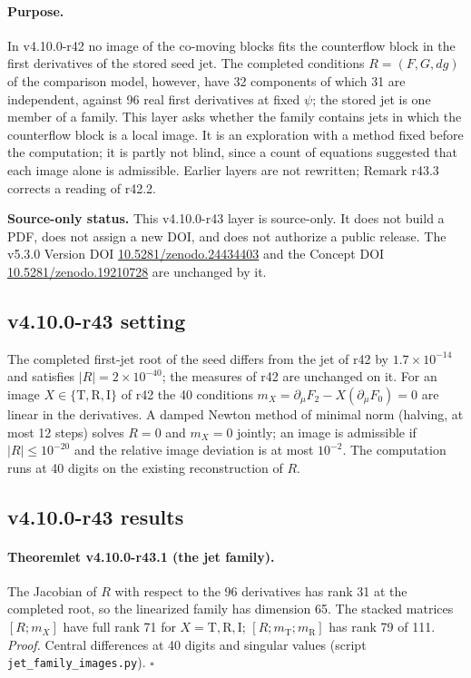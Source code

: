 \paragraph{Purpose.}
In v4.10.0-r42 no image of the co-moving blocks fits the counterflow block in the first derivatives of the stored seed jet.  The completed
conditions \(R=(F,G,dg)\) of the comparison model, however, have 32 components of which 31 are independent, against 96 real first derivatives at
fixed \(\psi\); the stored jet is one member of a family.  This layer asks whether the family contains jets in which the counterflow block is a
local image.  It is an exploration with a method fixed before the computation; it is partly not blind, since a count of equations suggested
that each image alone is admissible.  Earlier layers are not rewritten; Remark r43.3 corrects a reading of r42.2.

\noindent\textbf{Source-only status.}
This v4.10.0-r43 layer is source-only.  It does not build a PDF, does not assign a new DOI,
and does not authorize a public release.  The v5.3.0 Version DOI
\href{https://doi.org/10.5281/zenodo.24434403}{10.5281/zenodo.24434403} and the Concept DOI
\href{https://doi.org/10.5281/zenodo.19210728}{10.5281/zenodo.19210728} are unchanged by it.

\subsection*{v4.10.0-r43 setting}
\label{subsec:v4100-r43-setting}

The completed first-jet root of the seed differs from the jet of r42 by \(1.7\times10^{-14}\) and satisfies \(|R|=2\times10^{-40}\); the measures of r42 are
unchanged on it.  For an image \(X\in\{\mathrm T,\mathrm R,\mathrm I\}\) of r42 the 40 conditions \(m_X=\partial_\mu F_2-X(\partial_\mu F_0)=0\) are linear in the derivatives.
A damped Newton method of minimal norm (halving, at most 12 steps) solves \(R=0\) and \(m_X=0\) jointly; an image is admissible if \(|R|\le10^{-20}\) and
the relative image deviation is at most \(10^{-2}\).  The computation runs at 40 digits on the existing reconstruction of \(R\).

\subsection*{v4.10.0-r43 results}
\label{subsec:v4100-r43-results}

\paragraph{Theoremlet v4.10.0-r43.1 (the jet family).}
The Jacobian of \(R\) with respect to the 96 derivatives has rank 31 at the completed root, so the linearized family has dimension 65.  The stacked
matrices \([R;m_X]\) have full rank 71 for \(X=\mathrm T,\mathrm R,\mathrm I\); \([R;m_{\mathrm T};m_{\mathrm R}]\) has rank 79 of 111.
\emph{Proof.} Central differences at 40 digits and singular values (script \texttt{jet\_\allowbreak family\_\allowbreak images.py}).  \(\square\)

